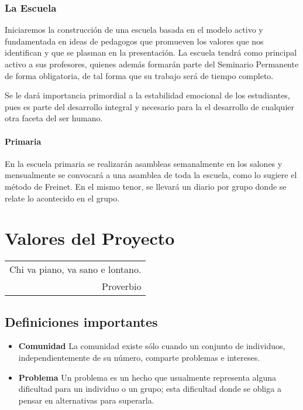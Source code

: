 \documentclass[10pt,letterpaper]{book}
\makeatletter
\newenvironment{myepigraph}
  {\par\hfill\itshape
   \begin{tabular}{@{}r@{\hspace{2em}}}} %
  {\end{tabular}\par\medskip}
\makeatother
\begin{document}
\subsection{La Escuela}
Iniciaremos la construcción de una escuela basada en el modelo activo y fundamentada en ideas de pedagogos que promueven los valores que nos identifican y que se plasman en la presentación. La escuela tendrá como principal activo  a sus profesores, quienes además formarán parte del Seminario Permanente de forma obligatoria, de tal forma que su trabajo será de tiempo completo.

Se le dará importancia primordial a la estabilidad emocional de los estudiantes, pues es parte del desarrollo integral y necesario para la el desarrollo de cualquier otra faceta del ser humano.

\subsubsection{Primaria}
En la escuela primaria se realizarán asambleas semanalmente en los salones y mensualmente se convocará a una asamblea de toda la escuela, como lo sugiere el método de Freinet. En el mismo tenor, se llevará un diario por grupo donde se relate lo acontecido en el grupo.

\chapter{Valores del Proyecto}

\begin{myepigraph}
Chi va piano, va sano e lontano.\\
Proverbio
\end{myepigraph}

\section*{Definiciones importantes}
\begin{itemize}

	\item {\bf Comunidad}	
La comunidad existe sólo cuando un conjunto de individuos, independientemente de su número, comparte problemas e intereses.
	
	\item {\bf Problema}
	Un problema es un hecho que usualmente representa alguna dificultad para un individuo o un grupo; esta dificultad donde se obliga a pensar en alternativas para superarla.
\end{itemize}
\end{document}
